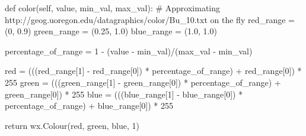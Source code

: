 \begin{code}[language=Python]
def color(self, value, min_val, max_val):
    # Approximating http://geog.uoregon.edu/datagraphics/color/Bu_10.txt on the fly
    red_range = (0, 0.9)
    green_range = (0.25, 1.0)
    blue_range = (1.0, 1.0)
    
    percentage_of_range = 1 - (value - min_val)/(max_val - min_val)
    
    red = (((red_range[1] - red_range[0]) * percentage_of_range) + red_range[0]) * 255
    green = (((green_range[1] - green_range[0]) * percentage_of_range) + green_range[0]) * 255
    blue = (((blue_range[1] - blue_range[0]) * percentage_of_range) + blue_range[0]) * 255
    
    return wx.Colour(red, green, blue, 1)
\end{code}




